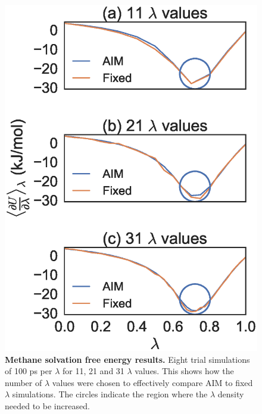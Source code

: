 \documentclass[fleqn,10pt,lineno]{wlpeerj} %
\begin{document}
\begin{figure}[htbp]
    \centering
    \includegraphics[width=1 \textwidth]{Figure_2_All_lambdas_at_100ps_per_lambda.eps}
    \caption{\textbf{Methane solvation free energy results.} Eight trial simulations of 100 ps per $\lambda$ for 11, 21 and 31 $\lambda$ values. This shows how the number of $\lambda$ values were chosen to effectively compare AIM to fixed $\lambda$ simulations. The circles indicate the region where the $\lambda$ density needed to be increased.}
    \label{increasinglambdas}
\end{figure}

\pagebreak
\end{document}
